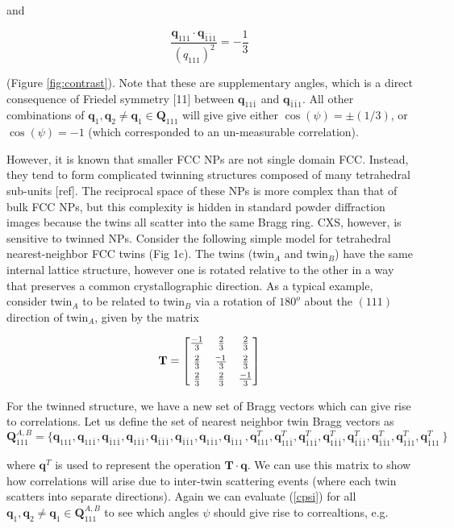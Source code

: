 \documentclass [11pt,fleqn]{article}
\newcommand*{\matminus}{%
  \leavevmode
  \hphantom{0}%
  \llap{%
    \settowidth{\dimen0 }{$0$}%
    \resizebox{1.1\dimen0 }{\height}{$-$}%
  }%
}
\def \be {\begin{equation}}
\def \ee {\end{equation}}
\begin{document}
and

\be \label {g2}
\frac{\bm q_{111} \cdot \bm q_{\bar{1}\bar{1}1}}{(q_{111})^2} = -\frac{1}{3}
\ee

(Figure \ref{fig:contrast}). Note that these are supplementary angles, which is a direct consequence of Friedel symmetry [11] between $\bm q_{11\bar{1}}$ and $\bm q_{\bar{1}\bar{1}1}$. All other combinations of $\bm q_1, \bm q_2 \ne \bm q_1 \in \bm Q_{111}$ will give give either  $\cos(\psi) = \pm (1/3)$, or $\cos(\psi) = -1$ (which corresponded to an un-measurable correlation). 

However, it is known that smaller FCC NPs are not single domain FCC. Instead, they tend to form complicated twinning structures composed of many tetrahedral sub-units [ref]. The reciprocal space of these NPs is more complex than that of bulk FCC NPs, but this complexity is hidden in standard powder diffraction images because the twins all scatter into the same Bragg ring. CXS, however, is sensitive to twinned NPs. Consider the following simple model for tetrahedral nearest-neighbor FCC twins (Fig 1c). The twins (twin$_A$ and twin$_B$) have the same internal lattice structure, however one is rotated relative to the other in a way that preserves a common crystallographic direction. As a typical example, consider twin$_A$ to be related to twin$_B$ via a rotation of $180^{o}$ about the $(111)$ direction of twin$_A$, given by the matrix

\be \label{twinmat}
\mathbf{T} = \begin{bmatrix}
       \frac{-1}{3} & \frac{2}{3} & \frac{2}{3}           \\[0.3em]
       \frac{2}{3} & \frac{\matminus 1}{3}           & \frac{2}{3} \\[0.3em]
       \frac{2}{3}           & \frac{2}{3} & \frac{-1}{3}
     \end{bmatrix}
\ee

For the twinned structure, we have a new set of Bragg vectors which can give rise to correlations. Let us define the set of nearest neighbor twin Bragg vectors as 
\be
\bm Q^{A,B}_{111} = \{\bm q_{111}, \bm q_{11\bar 1},\bm q_{\bar 1 1\bar 1},\bm q_{1\bar 1 \bar 1},\bm q_{\bar 1\bar 1\bar 1},\bm q_{\bar 1\bar 1 1},\bm q_{1 \bar 11},\bm q_{\bar 1 1 1}\, ,\bm q^T_{111}, \bm q^T_{11\bar 1},\bm q^T_{\bar 1 1\bar 1},\bm q^T_{1\bar 1 \bar 1},\bm q^T_{\bar 1\bar 1\bar 1},\bm q^T_{\bar 1\bar 1 1},\bm q^T_{1 \bar 11},\bm q^T_{\bar 1 1 1}\ \}
\ee

where $\bm q^T$ is used to represent the operation $\bm T \cdot \bm q$. We can use this matrix to show how correlations will arise due to inter-twin scattering events (where each twin scatters into separate directions). Again we can evaluate (\ref{cpsi}) for all $\bm q_1, \bm q_2 \ne \bm q_1 \in \bm Q^{A,B}_{111}$  to see which angles $\psi$ should give rise to correaltions, e.g.
\end{document}
